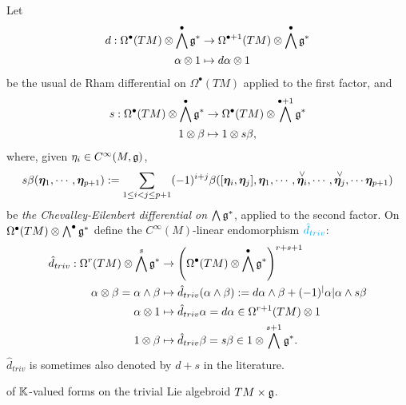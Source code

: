\begin{definition}
Let
\begin{align}
    d: \Omega^\bullet(TM) \otimes \bigwedge^\bullet \mathfrak{g}^* &\to \Omega^{\bullet+1}(TM) \otimes \bigwedge^\bullet \mathfrak{g}^*\\
    \alpha \otimes 1 &\mapsto d\alpha \otimes 1
\end{align}
be the usual de Rham differential on $\Omega^\bullet(TM)$ applied to the first factor, and
\begin{align*}
    s: \Omega^\bullet(TM) \otimes \bigwedge^\bullet \mathfrak{g}^* &\to \Omega^\bullet(TM) \otimes \bigwedge^{\bullet+1} \mathfrak{g}^* \\
    1 \otimes \beta &\mapsto 1 \otimes s\beta, 
\end{align*} where, given $\eta_i \in C^\infty(M, \mathfrak{g})$,
\begin{multline}
    s\beta(\bm{\eta}_1, \cdots, \bm{\eta}_{p+1}) := \sum_{1 \leq i < j \leq p+1} (-1)^{i+j} \beta([\bm{\eta}_i, \bm{\eta}_j], \bm{\eta}_1, \cdots, \overset{\vee}{\bm{\eta}_i}, \cdots, \overset{\vee}{\bm{\eta}_j}, \cdots \bm{\eta}_{p+1})
\end{multline}
be \emph{the Chevalley-Eilenbert differential on $\bigwedge \mathfrak{g}^*$}, applied to the second factor. On $\Omega^\bullet(TM) \otimes \bigwedge^\bullet \mathfrak{g}^*$ define the $C^\infty(M)$-linear endomorphism $\textcolor{cyan}{\hat d_{triv}}$:
\begin{align}
    \hat d_{triv}: \Omega^r(TM) \otimes \bigwedge^s \mathfrak{g}^* &\to \left( \Omega^\bullet(TM) \otimes \bigwedge^\bullet \mathfrak{g}^*\right)^{r+s+1} \\
    \alpha \otimes \beta = \alpha \wedge \beta &\mapsto  \hat d_{triv} (\alpha \wedge \beta) := d\alpha \wedge \beta + (-1)^|\alpha| \alpha \wedge s\beta \\
    \alpha \otimes 1 &\mapsto \hat d_{triv}\alpha = d\alpha \in \Omega^{r+1}(TM) \otimes 1 \\
    1 \otimes \beta &\mapsto \hat d_{triv}\beta = s\beta \in 1 \otimes \bigwedge^{s+1} \mathfrak{g}^*.
\end{align} $\hat d_{triv}$ is sometimes also denoted by $d+s$ in the literature.

\end{definition}

\begin{theorem}\label{theoIsoScalarFormsTLA}
 of $\mathbb{K}$-valued forms on the trivial Lie algebroid $TM \times \mathfrak{g}$.
\end{theorem}

